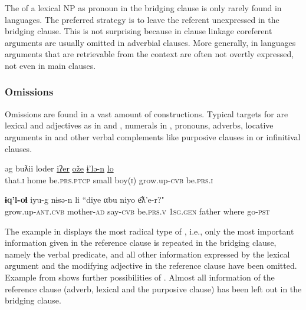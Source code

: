 \documentclass[output=paper]{LSP/langsci}
\begin{document}
The  of a lexical NP as pronoun in the bridging clause is only rarely found in  languages. The preferred strategy is to leave the referent unexpressed in the bridging clause. This is not surprising because in clause linkage coreferent arguments are usually omitted in adverbial clauses. More generally, in  languages arguments that are retrievable from the context are often not overtly expressed, not even in main clauses.  

\subsubsection{Omissions}
\label{ssec:Omissions}

Omissions are found in a vast amount of  constructions. Typical targets for  are lexical  and adjectives as in  and , numerals in , pronouns, adverbs, locative arguments in  and other verbal complements like purposive clauses in  or infinitival clauses.

\begin{exe}
	\ex	\label{ex:8ab}
	\begin{xlist}
		\ex	\label{ex:8a}
		\gll	əg			buƛii		loder					\underline{iʔer}	\underline{ože}	\underline{ɨ'lə-n}			\underline{lo}\\
			that.\textsc{i}		home		be.\textsc{prs.ptcp}		small	boy(\textsc{i})	grow.up-\textsc{cvb}	be.\textsc{prs.i}\\
		\glt	{}

		\ex	\label{ex:8b}
		\gll	\textbf{ɨq'l-oɬ}					iyu-g			nɨsə-n	li				``diye αbu		niyo		e͂ƛ'e-r?" \\
			grow.up-\textsc{ant.cvb}	mother-\textsc{ad}	say-\textsc{cvb}	be.\textsc{prs.v}		\textsc{1sg.gen} father		where	go-\textsc{pst}\\
		\glt	{} 
	\end{xlist}
\end{exe}

The example in  displays the most radical type of , i.e., only the most important information given in the reference clause is repeated in the bridging clause, namely the verbal predicate, and all other information expressed by the lexical argument and the modifying adjective in the reference clause have been omitted. Example  from  shows further possibilities of . Almost all information of the reference clause (adverb, lexical  and the purposive clause) has been left out in the bridging clause. 
\end{document}
